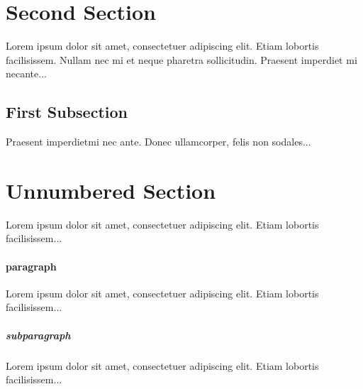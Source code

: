 \documentclass{book}
\begin{document}
    \section{Second Section}

    Lorem ipsum dolor sit amet, consectetuer adipiscing elit.  
    Etiam lobortis facilisissem.  Nullam nec mi et neque pharetra 
    sollicitudin.  Praesent imperdiet mi necante...

    \subsection{First Subsection}
    Praesent imperdietmi nec ante. Donec ullamcorper, felis non sodales...

    \section*{Unnumbered Section}
    Lorem ipsum dolor sit amet, consectetuer adipiscing elit.  
    Etiam lobortis facilisissem...

    \paragraph{paragraph}
    Lorem ipsum dolor sit amet, consectetuer adipiscing elit.  
    Etiam lobortis facilisissem...

    \subparagraph{subparagraph}
    Lorem ipsum dolor sit amet, consectetuer adipiscing elit.  
    Etiam lobortis facilisissem...
\end{document}
